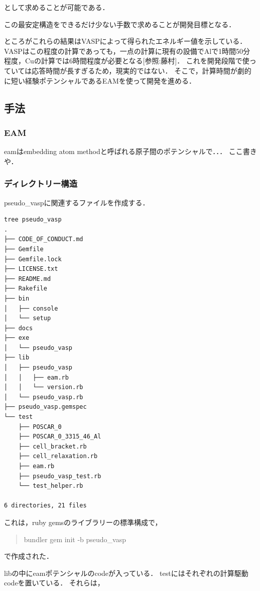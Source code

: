 \documentclass[11pt,dvipdfmx]{jsarticle}
\begin{document}
として求めることが可能である．

この最安定構造をできるだけ少ない手数で求めることが開発目標となる．

ところがこれらの結果はVASPによって得られたエネルギー値を示している．
VASPはこの程度の計算であっても，一点の計算に現有の設備でAlで1時間50分程度，Cuの計算では6時間程度が必要となる{[}参照:藤村{]}．
これを開発段階で使っていては応答時間が長すぎるため，現実的ではない．
そこで，計算時間が劇的に短い経験ポテンシャルであるEAMを使って開発を進める．

    \subsection{手法}\label{ux624bux6cd5}

\subsubsection{EAM}\label{eam}

eamはembedding atom methodと呼ばれる原子間のポテンシャルで．．．
ここ書きや．

    \subsubsection{ディレクトリー構造}\label{ux30c7ux30a3ux30ecux30afux30c8ux30eaux30fcux69cbux9020}

pseudo\_vaspに関連するファイルを作成する．

\begin{verbatim}
tree pseudo_vasp
.
├── CODE_OF_CONDUCT.md
├── Gemfile
├── Gemfile.lock
├── LICENSE.txt
├── README.md
├── Rakefile
├── bin
│   ├── console
│   └── setup
├── docs
├── exe
│   └── pseudo_vasp
├── lib
│   ├── pseudo_vasp
│   │   ├── eam.rb
│   │   └── version.rb
│   └── pseudo_vasp.rb
├── pseudo_vasp.gemspec
└── test
    ├── POSCAR_0
    ├── POSCAR_0_3315_46_Al
    ├── cell_bracket.rb
    ├── cell_relaxation.rb
    ├── eam.rb
    ├── pseudo_vasp_test.rb
    └── test_helper.rb

6 directories, 21 files
\end{verbatim}

これは，ruby gemsのライブラリーの標準構成で，

\begin{quote}
bundler gem init -b pseudo\_vasp
\end{quote}
で作成された．

libの中にeamポテンシャルのcodeが入っている．
testにはそれぞれの計算駆動codeを置いている． それらは，
\end{document}
